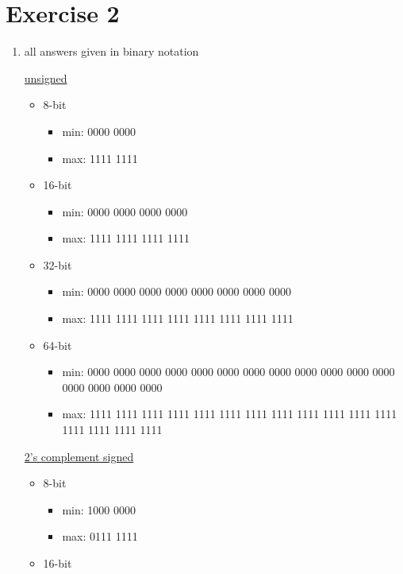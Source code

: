 \documentclass{article}
\begin{document}
\section{Exercise 2}
\begin{enumerate}
    \item all answers given in binary notation
    
    \underline{unsigned}
    \begin{itemize}
        \item 8-bit
        \begin{itemize}
            \item min: 0000 0000
            \item max: 1111 1111
        \end{itemize}
        \item 16-bit
        \begin{itemize}
            \item min: 0000 0000 0000 0000
            \item max: 1111 1111 1111 1111
        \end{itemize}
        \item 32-bit
        \begin{itemize}
            \item min: 0000 0000 0000 0000 0000 0000 0000 0000
            \item max: 1111 1111 1111 1111 1111 1111 1111 1111
        \end{itemize}
        \item 64-bit
        \begin{itemize}
            \item min: 0000 0000 0000 0000 0000 0000 0000 0000 0000 0000 0000 0000 0000 0000 0000 0000
            \item max: 1111 1111 1111 1111 1111 1111 1111 1111 1111 1111 1111 1111 1111 1111 1111 1111
        \end{itemize}
    \end{itemize}
    \underline{2's complement signed}
    \begin{itemize}
        \item 8-bit
        \begin{itemize}
            \item min: 1000 0000
            \item max: 0111 1111
        \end{itemize}
        \item 16-bit
        \begin{itemize}

\end{itemize}
\end{itemize}
\end{enumerate}
\end{document}
